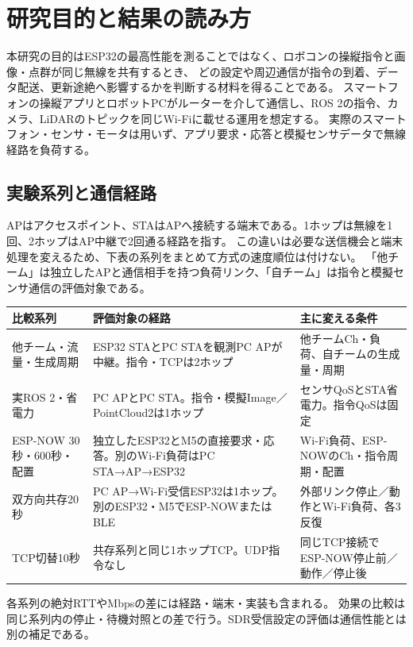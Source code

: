 \documentclass[a4paper,10pt]{ltjsarticle}
\begin{document}

\section{研究目的と結果の読み方}
本研究の目的はESP32の最高性能を測ることではなく、ロボコンの操縦指令と画像・点群が同じ無線を共有するとき、
どの設定や周辺通信が指令の到着、データ配送、更新途絶へ影響するかを判断する材料を得ることである。
スマートフォンの操縦アプリとロボットPCがルーターを介して通信し、ROS 2の指令、カメラ、LiDARのトピックを同じWi-Fiに載せる運用を想定する。
実際のスマートフォン・センサ・モータは用いず、アプリ要求・応答と模擬センサデータで無線経路を負荷する。

\subsection{実験系列と通信経路}
APはアクセスポイント、STAはAPへ接続する端末である。1ホップは無線を1回、2ホップはAP中継で2回通る経路を指す。
この違いは必要な送信機会と端末処理を変えるため、下表の系列をまとめて方式の速度順位は付けない。
「他チーム」は独立したAPと通信相手を持つ負荷リンク、「自チーム」は指令と模擬センサ通信の評価対象である。
\begin{center}\small\begin{tabular}{p{.23\linewidth}p{.35\linewidth}p{.32\linewidth}}\toprule
比較系列 & 評価対象の経路 & 主に変える条件\\\midrule
他チーム・流量・生成周期 & ESP32 STAとPC STAを観測PC APが中継。指令・TCPは2ホップ & 他チームCh・負荷、自チームの生成量・周期\\
実ROS 2・省電力 & PC APとPC STA。指令・模擬Image／PointCloud2は1ホップ & センサQoSとSTA省電力。指令QoSは固定\\
ESP-NOW 30秒・600秒・配置 & 独立したESP32とM5の直接要求・応答。別のWi-Fi負荷はPC STA→AP→ESP32 & Wi-Fi負荷、ESP-NOWのCh・指令周期・配置\\
双方向共存20秒 & PC AP→Wi-Fi受信ESP32は1ホップ。別のESP32・M5でESP-NOWまたはBLE & 外部リンク停止／動作とWi-Fi負荷、各3反復\\
TCP切替10秒 & 共存系列と同じ1ホップTCP。UDP指令なし & 同じTCP接続でESP-NOW停止前／動作／停止後\\\bottomrule
\end{tabular}\end{center}
各系列の絶対RTTやMbpsの差には経路・端末・実装も含まれる。
効果の比較は同じ系列内の停止・待機対照との差で行う。SDR受信設定の評価は通信性能とは別の補足である。
\end{document}
